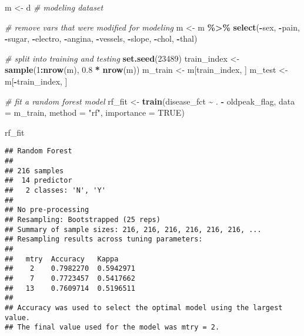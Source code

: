 \documentclass[
]{article}
\newenvironment{Shaded}{\begin{snugshade}}{\end{snugshade}}
\newcommand{\AttributeTok}[1]{\textcolor[rgb]{0.13,0.29,0.53}{#1}}
\newcommand{\CommentTok}[1]{\textcolor[rgb]{0.56,0.35,0.01}{\textit{#1}}}
\newcommand{\ConstantTok}[1]{\textcolor[rgb]{0.56,0.35,0.01}{#1}}
\newcommand{\DecValTok}[1]{\textcolor[rgb]{0.00,0.00,0.81}{#1}}
\newcommand{\FloatTok}[1]{\textcolor[rgb]{0.00,0.00,0.81}{#1}}
\newcommand{\FunctionTok}[1]{\textcolor[rgb]{0.13,0.29,0.53}{\textbf{#1}}}
\newcommand{\NormalTok}[1]{#1}
\newcommand{\OtherTok}[1]{\textcolor[rgb]{0.56,0.35,0.01}{#1}}
\newcommand{\SpecialCharTok}[1]{\textcolor[rgb]{0.81,0.36,0.00}{\textbf{#1}}}
\newcommand{\StringTok}[1]{\textcolor[rgb]{0.31,0.60,0.02}{#1}}
\begin{document}
\begin{Shaded}
\begin{Highlighting}[]
\NormalTok{m }\OtherTok{\textless{}{-}}\NormalTok{ d }\CommentTok{\# modeling dataset}

\CommentTok{\# remove vars that were modified for modeling}
\NormalTok{m }\OtherTok{\textless{}{-}}\NormalTok{ m }\SpecialCharTok{\%\textgreater{}\%}
  \FunctionTok{select}\NormalTok{(}\SpecialCharTok{{-}}\NormalTok{sex, }\SpecialCharTok{{-}}\NormalTok{pain, }\SpecialCharTok{{-}}\NormalTok{sugar, }\SpecialCharTok{{-}}\NormalTok{electro, }\SpecialCharTok{{-}}\NormalTok{angina, }\SpecialCharTok{{-}}\NormalTok{vessels, }\SpecialCharTok{{-}}\NormalTok{slope, }\SpecialCharTok{{-}}\NormalTok{chol,}
         \SpecialCharTok{{-}}\NormalTok{thal)}

\CommentTok{\# split into training and testing}
\FunctionTok{set.seed}\NormalTok{(}\DecValTok{23489}\NormalTok{)}
\NormalTok{train\_index }\OtherTok{\textless{}{-}} \FunctionTok{sample}\NormalTok{(}\DecValTok{1}\SpecialCharTok{:}\FunctionTok{nrow}\NormalTok{(m), }\FloatTok{0.8} \SpecialCharTok{*} \FunctionTok{nrow}\NormalTok{(m))}
\NormalTok{m\_train }\OtherTok{\textless{}{-}}\NormalTok{ m[train\_index, ]}
\NormalTok{m\_test }\OtherTok{\textless{}{-}}\NormalTok{ m[}\SpecialCharTok{{-}}\NormalTok{train\_index, ]}
\end{Highlighting}
\end{Shaded}

\begin{Shaded}
\begin{Highlighting}[]
\CommentTok{\# fit a random forest model }
\NormalTok{rf\_fit }\OtherTok{\textless{}{-}} \FunctionTok{train}\NormalTok{(disease\_fct }\SpecialCharTok{\textasciitilde{}}\NormalTok{ . }\SpecialCharTok{{-}}\NormalTok{ oldpeak\_flag, }
                \AttributeTok{data =}\NormalTok{ m\_train, }
                \AttributeTok{method =} \StringTok{"rf"}\NormalTok{,}
                \AttributeTok{importance =} \ConstantTok{TRUE}\NormalTok{)}

\NormalTok{rf\_fit}
\end{Highlighting}
\end{Shaded}

\begin{verbatim}
## Random Forest 
## 
## 216 samples
##  14 predictor
##   2 classes: 'N', 'Y' 
## 
## No pre-processing
## Resampling: Bootstrapped (25 reps) 
## Summary of sample sizes: 216, 216, 216, 216, 216, 216, ... 
## Resampling results across tuning parameters:
## 
##   mtry  Accuracy   Kappa    
##    2    0.7982270  0.5942971
##    7    0.7723457  0.5417662
##   13    0.7609714  0.5196511
## 
## Accuracy was used to select the optimal model using the largest value.
## The final value used for the model was mtry = 2.
\end{verbatim}
\end{document}
